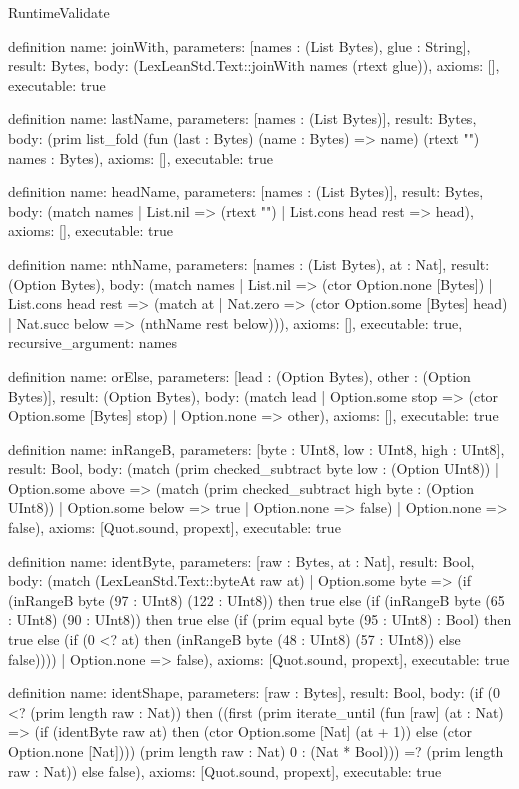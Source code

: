 \begin{lexlean}{RuntimeValidate}
\begin{semanticmodule}
definition{
  name: joinWith,
  parameters: [names : (List Bytes), glue : String],
  result: Bytes,
  body: (LexLeanStd.Text::joinWith names (rtext glue)),
  axioms: [],
  executable: true
}

definition{
  name: lastName,
  parameters: [names : (List Bytes)],
  result: Bytes,
  body: (prim list_fold (fun (last : Bytes) (name : Bytes) => name) (rtext "") names : Bytes),
  axioms: [],
  executable: true
}

definition{
  name: headName,
  parameters: [names : (List Bytes)],
  result: Bytes,
  body: (match names | List.nil => (rtext "") | List.cons head rest => head),
  axioms: [],
  executable: true
}

definition{
  name: nthName,
  parameters: [names : (List Bytes), at : Nat],
  result: (Option Bytes),
  body: (match names
    | List.nil => (ctor Option.none [Bytes])
    | List.cons head rest => (match at
      | Nat.zero => (ctor Option.some [Bytes] head)
      | Nat.succ below => (nthName rest below))),
  axioms: [],
  executable: true,
  recursive_argument: names
}

definition{
  name: orElse,
  parameters: [lead : (Option Bytes), other : (Option Bytes)],
  result: (Option Bytes),
  body: (match lead | Option.some stop => (ctor Option.some [Bytes] stop) | Option.none => other),
  axioms: [],
  executable: true
}

definition{
  name: inRangeB,
  parameters: [byte : UInt8, low : UInt8, high : UInt8],
  result: Bool,
  body: (match (prim checked_subtract byte low : (Option UInt8))
    | Option.some above => (match (prim checked_subtract high byte : (Option UInt8))
      | Option.some below => true
      | Option.none => false)
    | Option.none => false),
  axioms: [Quot.sound, propext],
  executable: true
}

definition{
  name: identByte,
  parameters: [raw : Bytes, at : Nat],
  result: Bool,
  body: (match (LexLeanStd.Text::byteAt raw at)
    | Option.some byte => (if (inRangeB byte (97 : UInt8) (122 : UInt8)) then true else (if (inRangeB byte (65 : UInt8) (90 : UInt8)) then true else (if (prim equal byte (95 : UInt8) : Bool) then true else (if (0 <? at) then (inRangeB byte (48 : UInt8) (57 : UInt8)) else false))))
    | Option.none => false),
  axioms: [Quot.sound, propext],
  executable: true
}

definition{
  name: identShape,
  parameters: [raw : Bytes],
  result: Bool,
  body: (if (0 <? (prim length raw : Nat)) then ((first (prim iterate_until (fun [raw] (at : Nat) => (if (identByte raw at) then (ctor Option.some [Nat] (at + 1)) else (ctor Option.none [Nat]))) (prim length raw : Nat) 0 : (Nat * Bool))) =? (prim length raw : Nat)) else false),
  axioms: [Quot.sound, propext],
  executable: true
}


\end{semanticmodule}
\end{lexlean}
